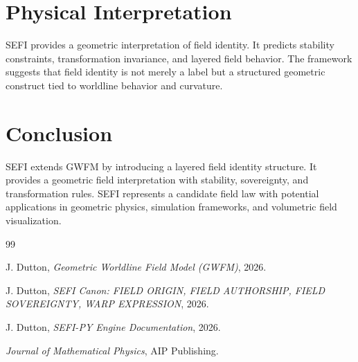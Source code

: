 \documentclass[12pt]{article}
\begin{document}
\section{Physical Interpretation}
SEFI provides a geometric interpretation of field identity. It predicts stability constraints, transformation invariance, and layered field behavior. The framework suggests that field identity is not merely a label but a structured geometric construct tied to worldline behavior and curvature.

\section{Conclusion}
SEFI extends GWFM by introducing a layered field identity structure. It provides a geometric field interpretation with stability, sovereignty, and transformation rules. SEFI represents a candidate field law with potential applications in geometric physics, simulation frameworks, and volumetric field visualization.

\begin{thebibliography}{99}

J. Dutton, \textit{Geometric Worldline Field Model (GWFM)}, 2026.

J. Dutton, \textit{SEFI Canon: FIELD ORIGIN, FIELD AUTHORSHIP, FIELD SOVEREIGNTY, WARP EXPRESSION}, 2026.

J. Dutton, \textit{SEFI-PY Engine Documentation}, 2026.

\textit{Journal of Mathematical Physics}, AIP Publishing.

\end{thebibliography}
\end{document}
